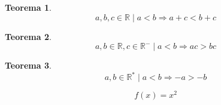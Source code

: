 \documentclass[
]{book}
\newtheorem{theorem}{Teorema}[chapter]
\theoremstyle{definition}
\theoremstyle{definition}
\theoremstyle{definition}
\theoremstyle{definition}
\theoremstyle{remark}
\begin{document}
\begin{theorem}
\protect\hypertarget{thm:thmordtrans}{}\label{thm:thmordtrans}\[
a, b, c \in \mathbb{R} \mid a < b \Rightarrow a+c < b+c
\]
\end{theorem}

\begin{theorem}
\protect\hypertarget{thm:thmordmulti}{}\label{thm:thmordmulti}\[
a, b \in \mathbb{R}, c \in \mathbb{R}^- \mid a < b \Rightarrow ac > bc
\]
\end{theorem}

\begin{theorem}
\protect\hypertarget{thm:thmordinv}{}\label{thm:thmordinv}\[
a, b \in \mathbb{R}^* \mid a < b \Rightarrow -a > -b
\]
\end{theorem}

\[
f(x) = x^2
\]

  
\end{document}
